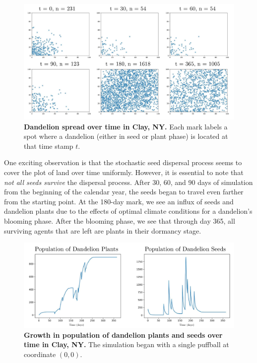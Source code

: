 \begin{figure}[h!]
\centering
    \includegraphics[scale=0.5]{figures/moderateclimatespread.pdf}
    \captionsetup{width=0.9\textwidth}
    \caption{\textbf{Dandelion spread over time in Clay, NY.} Each mark labels a spot where a dandelion (either in seed or plant phase) is located at that time stamp \(t\).}
    \label{fig:temperatespread}
\end{figure}

One exciting observation is that the stochastic seed dispersal process seems to cover the plot of land over time uniformly. However, it is essential to note that \textit{not all seeds survive} the dispersal process. After 30, 60, and 90 days of simulation from the beginning of the calendar year, the seeds began to travel even farther from the starting point. At the 180-day mark, we see an influx of seeds and dandelion plants due to the effects of optimal climate conditions for a dandelion's blooming phase. After the blooming phase, we see that through day 365, all surviving agents that are left are plants in their dormancy stage.

\begin{figure}[h!]
\centering
    \includegraphics[scale=0.5]{figures/moderateclimatepopulation.pdf}
    \captionsetup{width=0.9\textwidth}
    \caption{\textbf{Growth in population of dandelion plants and seeds over time in Clay, NY.} The simulation began with a single puffball at coordinate \((0, 0)\).}
    \label{fig:temperatepopulation}
\end{figure}

